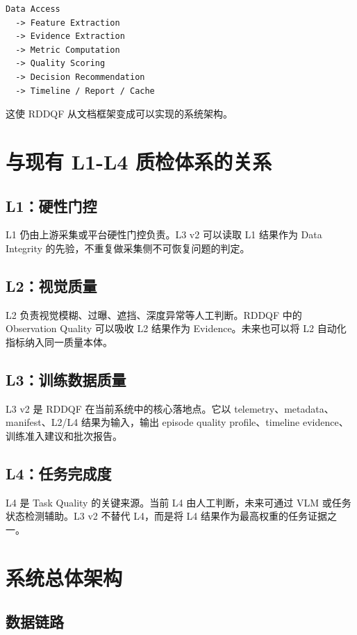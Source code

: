 \documentclass[UTF8,zihao=-4]{ctexart}
\begin{document}
\begin{verbatim}
Data Access
  -> Feature Extraction
  -> Evidence Extraction
  -> Metric Computation
  -> Quality Scoring
  -> Decision Recommendation
  -> Timeline / Report / Cache
\end{verbatim}

这使 RDDQF 从文档框架变成可以实现的系统架构。

\section{与现有 L1-L4 质检体系的关系}

\subsection{L1：硬性门控}

L1 仍由上游采集或平台硬性门控负责。L3 v2 可以读取 L1 结果作为 Data Integrity 的先验，不重复做采集侧不可恢复问题的判定。

\subsection{L2：视觉质量}

L2 负责视觉模糊、过曝、遮挡、深度异常等人工判断。RDDQF 中的 Observation Quality 可以吸收 L2 结果作为 Evidence。未来也可以将 L2 自动化指标纳入同一质量本体。

\subsection{L3：训练数据质量}

L3 v2 是 RDDQF 在当前系统中的核心落地点。它以 telemetry、metadata、manifest、L2/L4 结果为输入，输出 episode quality profile、timeline evidence、训练准入建议和批次报告。

\subsection{L4：任务完成度}

L4 是 Task Quality 的关键来源。当前 L4 由人工判断，未来可通过 VLM 或任务状态检测辅助。L3 v2 不替代 L4，而是将 L4 结果作为最高权重的任务证据之一。

\section{系统总体架构}

\subsection{数据链路}
\end{document}
